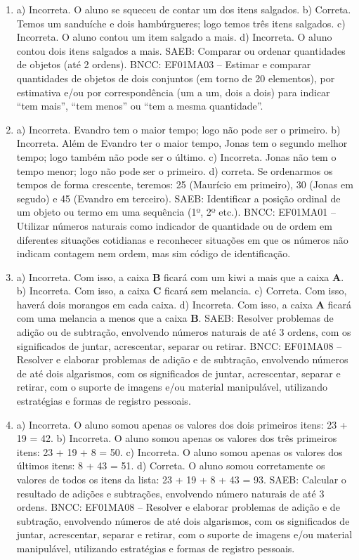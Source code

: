 \begin{enumerate}
\item
a) Incorreta. O aluno se squeceu de contar um dos itens salgados.
b) Correta. Temos um sanduíche e dois hambúrgueres; logo temos três
itens salgados.
c) Incorreta. O aluno contou um item salgado a mais.
d) Incorreta. O aluno contou dois itens salgados a mais.
SAEB: Comparar ou ordenar quantidades de objetos (até 2 ordens).
BNCC: EF01MA03 -- Estimar e comparar quantidades de objetos de dois
conjuntos (em torno de 20 elementos), por estimativa e/ou por
correspondência (um a um, dois a dois) para indicar ``tem mais'', ``tem
menos'' ou ``tem a mesma quantidade''.

\item
a) Incorreta. Evandro tem o maior tempo; logo não pode ser o primeiro.
b) Incorreta. Além de Evandro ter o maior tempo, Jonas tem o segundo
melhor tempo; logo também não pode ser o último.
c) Incorreta. Jonas não tem o tempo menor; logo não pode ser o
primeiro.
d) correta. Se ordenarmos os tempos de forma crescente, teremos: 25 (Maurício em primeiro),
30 (Jonas em segudo) e 45 (Evandro em terceiro).
SAEB: Identificar a posição ordinal de um objeto ou termo em
uma sequência (1º, 2º etc.).
BNCC: EF01MA01 -- Utilizar números naturais como indicador de quantidade
ou de ordem em diferentes situações cotidianas e reconhecer situações em
que os números não indicam contagem nem ordem, mas sim código de
identificação.

\item
a) Incorreta. Com isso, a caixa \textbf{B} ficará com um kiwi a mais que a caixa \textbf{A}.
b) Incorreta. Com isso, a caixa \textbf{C} ficará sem melancia.
c) Correta. Com isso, haverá dois morangos em cada caixa.
d) Incorreta. Com isso, a caixa \textbf{A} ficará com uma melancia a menos que a
caixa \textbf{B}.
SAEB: Resolver problemas de adição ou de subtração, envolvendo
números naturais de até 3 ordens, com os significados de juntar,
acrescentar, separar ou retirar.
BNCC: EF01MA08 -- Resolver e elaborar problemas de adição e de subtração,
envolvendo números de até dois algarismos, com os significados de
juntar, acrescentar, separar e retirar, com o suporte de imagens e/ou
material manipulável, utilizando estratégias e formas de registro
pessoais.

\item
a) Incorreta. O aluno somou apenas os valores dos dois primeiros itens: 23 + 19 = 42.
b) Incorreta. O aluno somou apenas os valores dos três primeiros itens: 23 + 19 + 8 = 50.
c) Incorreta. O aluno somou apenas os valores dos últimos itens: 8 + 43 = 51.
d) Correta. O aluno somou corretamente os valores de todos os itens da lista: 23 + 19 + 8 + 43 = 93.
SAEB: Calcular o resultado de adições e subtrações, envolvendo
número naturais de até 3 ordens.
BNCC: EF01MA08 -- Resolver e elaborar problemas de adição e de subtração,
envolvendo números de até dois algarismos, com os significados de
juntar, acrescentar, separar e retirar, com o suporte de imagens e/ou
material manipulável, utilizando estratégias e formas de registro
pessoais.


\end{enumerate}
